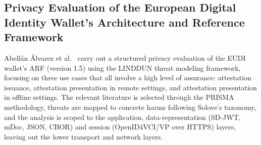 \documentclass{article}
\begin{document}
\subsection{Privacy Evaluation of the European Digital Identity Wallet’s Architecture and Reference Framework}
\label{privevaleudi}
Abellán Álvarez et al.~\cite{AbellanAlvarez2026Privacy} carry out a structured privacy evaluation of the EUDI wallet's
ARF (version 1.5) using the LINDDUN threat modeling framework, focusing on three use cases that all involve a high
level of assurance: attestation issuance, attestation presentation in remote settings, and attestation presentation in
offline settings. The relevant literature is selected through the PRISMA methodology, threats are mapped to concrete
harms following Solove's taxonomy, and the analysis is scoped to the application, data-representation (SD-JWT, mDoc,
JSON, CBOR) and session (OpenID4VCI/VP over HTTPS) layers, leaving out the lower transport and network layers.
\end{document}

